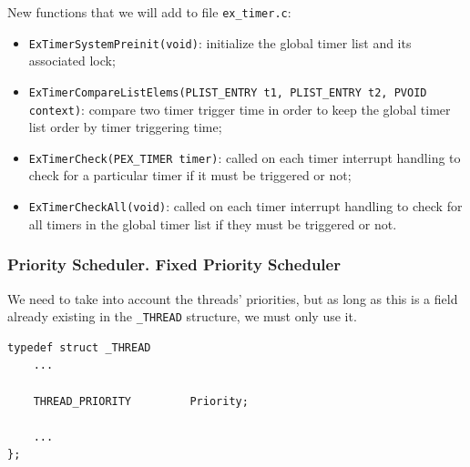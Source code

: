 New functions that we will add to file \lstinline|ex_timer.c|:
\begin{itemize}
    \item \lstinline|ExTimerSystemPreinit(void)|: initialize the global timer list and its associated lock;
    \item \lstinline|ExTimerCompareListElems(PLIST_ENTRY t1, PLIST_ENTRY t2, PVOID context)|: compare two timer trigger time in order to keep the global timer list order by timer triggering time;
    \item \lstinline|ExTimerCheck(PEX_TIMER timer)|: called on each timer interrupt handling to check for a particular timer if it must be triggered or not;
    \item \lstinline|ExTimerCheckAll(void)|: called on each timer interrupt handling to check for all timers in the global timer list if they must be triggered or not.
\end{itemize}


\subsubsection{Priority Scheduler. Fixed Priority Scheduler}
\label{subsubsec:prio-sched-data-structures}

We need to take into account the threads' priorities, but as long as this is a field already existing in the \lstinline|_THREAD| structure, we must only use it. 

\begin{lstlisting}
typedef struct _THREAD
    ...
    
    THREAD_PRIORITY         Priority;
    
    ...
};
\end{lstlisting}



